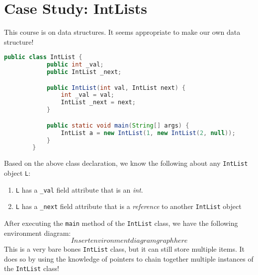 \documentclass{article}
\begin{document}
\section{Case Study: IntLists}
This course is on data structures. It seems appropriate to make our own data structure!
    \begin{lstlisting}[language=Java]
        public class IntList {
            public int _val;
            public IntList _next;

            public IntList(int val, IntList next) {
                int _val = val;
                IntList _next = next;
            }

            public static void main(String[] args) {
                IntList a = new IntList(1, new IntList(2, null));
            }
        }
    \end{lstlisting}
Based on the above class declaration, we know the following about any \texttt{IntList} object \texttt{L}:
    \begin{enumerate}
        \item \texttt{L} has a \texttt{\_val} field attribute that is an \textit{int}.
        \item \texttt{L} has a \texttt{\_next} field attribute that is a \textit{reference} to another \texttt{IntList} object
    \end{enumerate}
After executing the \texttt{main} method of the \texttt{IntList} class, we have the following environment diagram:
        $$Insert environment diagram graph here$$
This is a very bare bones \texttt{IntList} class, but it can still store multiple items. It does so by using the knowledge of pointers to chain together multiple instances of the \texttt{IntList} class!

%
%
%
\end{document}
